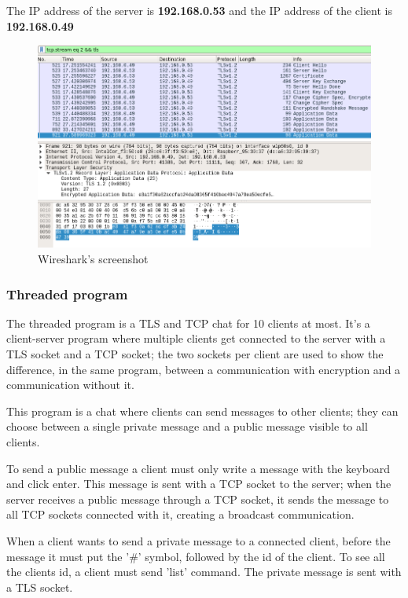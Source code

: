 \documentclass[a4paper,12pt]{article}
\begin{document}
The IP address of the server is \textbf{192.168.0.53} and the IP address of the client is \textbf{192.168.0.49}
\begin{figure}[H]
    \centering
    \includegraphics[scale=0.5]{./code/img/wireshark-iterative.png}
    \caption{Wireshark's screenshot}
    
\end{figure}
\subsubsection{Threaded program}
The threaded program is a TLS and TCP chat for 10 clients at most. It's a client-server program where multiple clients get connected to the server with a TLS socket and a TCP socket; the two sockets per client are used to show the difference, in the same program, between a communication with encryption and a communication without it.

This program is a chat where clients can send messages to other clients; they can choose between a single private message and a public message visible to all clients. 

To send a public message a client must only write a message with the keyboard and click enter. This message is sent with a TCP socket to the server; when the server receives a public message through a TCP socket, it sends the message to all TCP sockets connected with it, creating a broadcast communication.

When a client wants to send a private message to a connected client, before the message it must put the '\#' symbol, followed by the id of the client. To see all the clients id, a client must send 'list' command. The private message is sent with a TLS socket.
\end{document}
